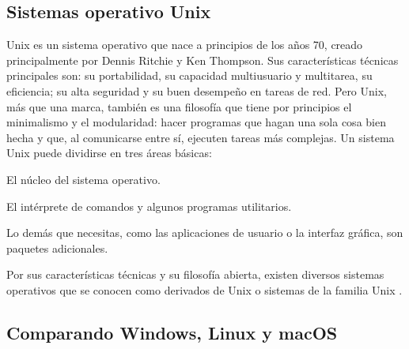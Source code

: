 \subsection{Sistemas operativo Unix}

\begin{list}{}%
    {\setlength{\leftmargin}{1cm}\setlength{\rightmargin}{1cm}}
    \item\relax
    \small

Unix es un sistema operativo que nace a principios de los años 70, creado principalmente por Dennis Ritchie y Ken Thompson. Sus características técnicas principales son: su portabilidad, su capacidad multiusuario y multitarea, su eficiencia; su alta seguridad y su buen desempeño en tareas de red. Pero Unix, más que una marca, también es una filosofía que tiene por principios el minimalismo y el modularidad: hacer programas que hagan una sola cosa bien hecha y que, al comunicarse entre sí, ejecuten tareas más complejas.
Un sistema Unix puede dividirse en tres áreas básicas: 

        El núcleo del sistema operativo.

        El intérprete de comandos y algunos programas utilitarios.

        Lo demás que necesitas, como las aplicaciones de usuario o la interfaz gráfica, son paquetes adicionales.

Por sus características técnicas y su filosofía abierta, existen diversos sistemas operativos que se conocen como derivados de Unix o sistemas de la familia Unix \cite{CitaD9}.

\end{list}



\subsection{Comparando Windows, Linux y macOS}


